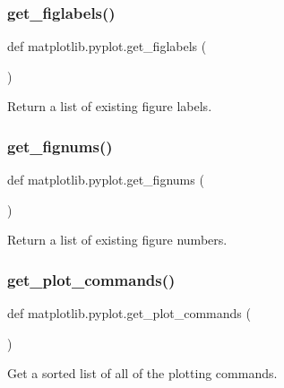 \subsubsection{\texorpdfstring{get\+\_\+figlabels()}{get\_figlabels()}}
{\footnotesize\ttfamily def matplotlib.\+pyplot.\+get\+\_\+figlabels (\begin{DoxyParamCaption}{ }\end{DoxyParamCaption})}

\begin{DoxyVerb}Return a list of existing figure labels.\end{DoxyVerb}
 \mbox{\label{namespacematplotlib_1_1pyplot_a360d294428c7095e3f3743aa17a9d65c}} 
\subsubsection{\texorpdfstring{get\+\_\+fignums()}{get\_fignums()}}
{\footnotesize\ttfamily def matplotlib.\+pyplot.\+get\+\_\+fignums (\begin{DoxyParamCaption}{ }\end{DoxyParamCaption})}

\begin{DoxyVerb}Return a list of existing figure numbers.\end{DoxyVerb}
 \mbox{\label{namespacematplotlib_1_1pyplot_af6cbc41b6baf3fce6b0bd919f4e08174}} 
\subsubsection{\texorpdfstring{get\+\_\+plot\+\_\+commands()}{get\_plot\_commands()}}
{\footnotesize\ttfamily def matplotlib.\+pyplot.\+get\+\_\+plot\+\_\+commands (\begin{DoxyParamCaption}{ }\end{DoxyParamCaption})}

\begin{DoxyVerb}Get a sorted list of all of the plotting commands.
\end{DoxyVerb}
 \mbox{\label{namespacematplotlib_1_1pyplot_a37192e3d4a4956663e32ade008323c67}} 
